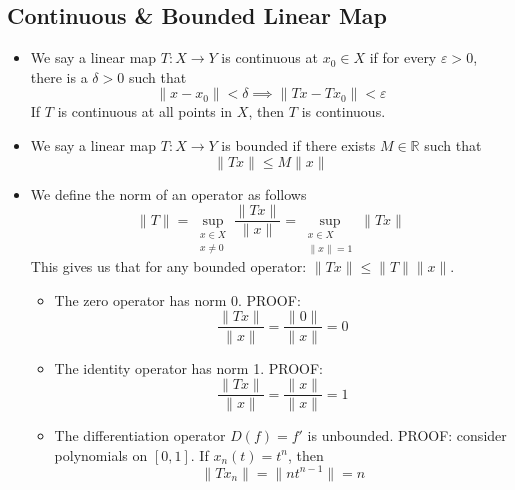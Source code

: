 \documentclass{article}
\newcommand{\R}{\mathbb{R}}
\theoremstyle{plain}
\theoremstyle{definition}
\begin{document}
		\subsection{Continuous \& Bounded Linear Map}
		\begin{itemize}
				\item We say a linear map $T: X\to Y$ is continuous at $x_0\in X$ if for every $\varepsilon > 0$, there is a $\delta > 0$ such that 
				\begin{equation*}
						\|x - x_0\| < \delta \implies \|Tx - Tx_0\| < \varepsilon
				\end{equation*}
				If $T$ is continuous at all points in $X$, then $T$ is continuous. 

				\item We say a linear map $T: X\to Y$ is bounded if there exists $M\in\R$ such that 
						\begin{equation*}
								\|Tx\| \leq M\|x\|
						\end{equation*}

				\item We define the norm of an operator as follows 
						\begin{equation*}
								\|T\| = \sup_{\substack{x\in X \\ x \neq 0}} \frac{\|Tx\|}{\|x\|} = \sup_{\substack{x\in X \\ \|x\| = 1}} \|Tx\|
						\end{equation*}
						This gives us that for any bounded operator: $\|Tx\| \leq \|T\|\|x\|$. 
						\begin{itemize}
								\item The zero operator has norm 0. PROOF: 
										\begin{equation*}
												\frac{\|Tx\|}{\|x\|} = \frac{\|0\|}{\|x\|} = 0
										\end{equation*}
								\item The identity operator has norm 1. PROOF: 
										\begin{equation*}
												\frac{\|Tx\|}{\|x\|} = \frac{\|x\|}{\|x\|} = 1
										\end{equation*}
								\item The differentiation operator $D(f) = f'$ is unbounded. PROOF: consider polynomials on $[0, 1]$. If $x_n(t) = t^n$, then 
										\begin{equation*}
												\|Tx_n\| = \|nt^{n-1}\| = n
										\end{equation*}
						\end{itemize}
		\end{itemize}
\end{document}
